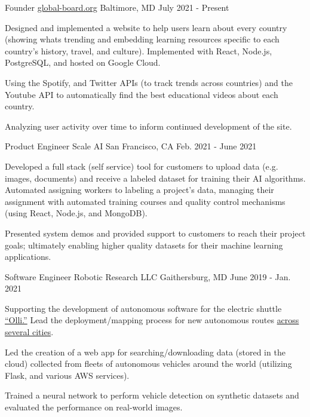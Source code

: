 
\begin{cventries}
  \cventry
    {Founder} %
    {\href{https://global-board.org}{global-board.org}} %
    {Baltimore, MD} %
    {July 2021 - Present} %
    {
      \begin{cvitems} %
        \item {Designed and implemented a website to help users learn about every country (showing whats trending and embedding learning resources specific to each country's history, travel, and culture).  Implemented with React, Node.js, PostgreSQL, and hosted on Google Cloud.}
        \item {Using the Spotify, and Twitter APIs (to track trends across countries) and the Youtube API to automatically find the best educational videos about each country.}
        \item {Analyzing user activity over time to inform continued development of the site.}
      \end{cvitems}
    }

  \cventry
    {Product Engineer} %
    {Scale AI} %
    {San Francisco, CA} %
    {Feb. 2021 - June 2021} %
    {
      \begin{cvitems} %
        \item {Developed a full stack (self service) tool for customers to upload data (e.g. images, documents) and receive a labeled dataset for training their AI algorithms.  Automated assigning workers to labeling a project's data, managing their assignment with automated training courses and quality control mechanisms (using React, Node.js, and MongoDB).}
        \item {Presented system demos and provided support to customers to reach their project goals; ultimately enabling higher quality datasets for their machine learning applications.}
      \end{cvitems}
    }

  \cventry
    {Software Engineer} %
    {Robotic Research LLC} %
    {Gaithersburg, MD} %
    {June 2019 - Jan. 2021} %
    {
      \begin{cvitems} %
        \item {Supporting the development of autonomous software for the electric 
          shuttle \href{https://localmotors.com/olli}{``Olli.''}  Lead the deployment/mapping process for new autonomous routes \href{https://localmotors.com/deployments}{across several cities}.}
        \item {Led the creation of a web app for searching/downloading data (stored in the cloud) collected from fleets of autonomous vehicles around the world (utilizing Flask, and various AWS services).}
        \item {Trained a neural network to perform vehicle detection on synthetic datasets and evaluated the performance on real-world images.}
      \end{cvitems}
    }


\end{cventries}
